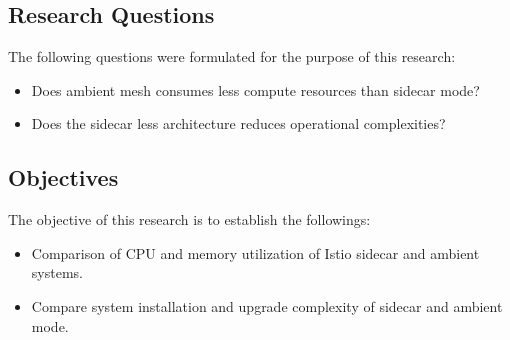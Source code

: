\subsection{Research Questions}
The following questions were formulated for the purpose of this research:
\begin{itemize}
  \item Does ambient mesh consumes less compute resources than sidecar mode?
  \item Does the sidecar less architecture reduces operational complexities?
\end{itemize}

\subsection{Objectives}
The objective of this research is to establish the followings:
\begin{itemize}
  \item Comparison of CPU and memory utilization of Istio sidecar and ambient systems.
  \item Compare system installation and upgrade complexity of sidecar and ambient mode.
\end{itemize}
